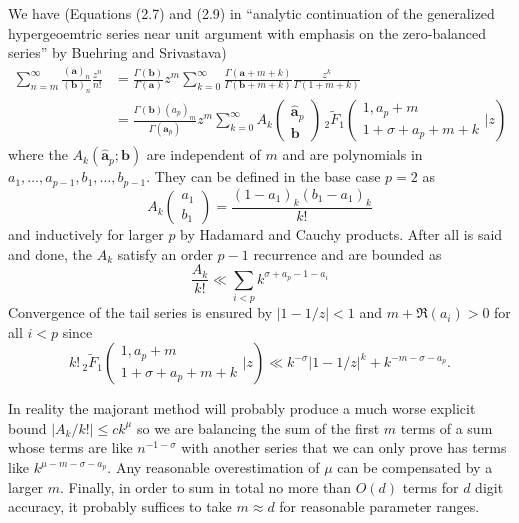\documentclass[12pt]{article}
\numberwithin{equation}{section}
\begin{document}
We have (Equations (2.7) and (2.9) in ``analytic continuation of the generalized hypergeoemtric series near unit argument with emphasis on the zero-balanced series'' by Buehring and Srivastava)
\begin{align}
\nonumber
\sum_{n=m}^{\infty}{\frac{(\mathbf{a})_n}{(\mathbf{b})_n} \frac{z^n}{n!}}&=\frac{\Gamma(\mathbf{b})}{\Gamma(\mathbf{a})} z^m \sum_{k=0}^{\infty} {\frac{\Gamma(\mathbf{a}+m+k)}{\Gamma(\mathbf{b}+m+k)} \frac{z^k}{\Gamma(1+m+k)}}\\
\label{buehring}
&=\frac{\Gamma(\mathbf{b})(a_p)_m}{\Gamma(\hat{\mathbf{a}}_p)} z^m \sum_{k=0}^{\infty} {A_k\left(\begin{array}{c} \hat{\mathbf{a}}_p \\ \mathbf{b} \end{array}\right)} \,{} _2\tilde{F}_1\left( \begin{array}{c} 1,a_p+m \\ 1+\sigma+a_p+m+k \end{array} \Big| z\right)
\end{align}
where the $A_k(\hat{\mathbf{a}}_p; \mathbf{b})$ are independent of $m$ and are polynomials in $a_1,\dots,a_{p-1},b_1,\dots,b_{p-1}$. They can be defined in the base case $p=2$ as
\begin{equation*}
A_k\left(\begin{array}{c} a_1 \\ b_1 \end{array}\right) = \frac{(1-a_1)_k(b_1-a_1)_k}{k!}
\end{equation*}
and inductively for larger $p$ by Hadamard and Cauchy products. After all is said and done, the $A_k$ satisfy an order $p-1$ recurrence and are bounded as
\begin{equation}
\frac{A_k}{k!} \ll \sum_{i<p}k^{\sigma+a_p-1-a_i}
\end{equation}
Convergence of the tail series is ensured by
$|1-1/z|<1$ and $m+\Re(a_i)>0$ for all $i<p$ since
\begin{equation*}
k! \, _2\tilde{F}_1\left( \begin{array}{c} 1,a_p+m \\ 1+\sigma+a_p+m+k \end{array} \Big| z\right) \ll k^{-\sigma} \left|1-1/z\right|^k + k^{-m-\sigma-a_p}\text{.}
\end{equation*}

In reality the majorant method will probably produce a much worse explicit bound $|A_k/k!| \le c k^{\mu}$ so we are balancing the sum of the first $m$ terms of a sum whose terms are like $n^{-1-\sigma}$ with another series that we can only prove has terms like $k^{\mu-m-\sigma-a_p}$. Any reasonable overestimation of $\mu$ can be compensated by a larger $m$. Finally, in order to sum in total no more than $O(d)$ terms for $d$ digit accuracy, it probably suffices to take $m \approx d$ for reasonable parameter ranges.
\end{document}
